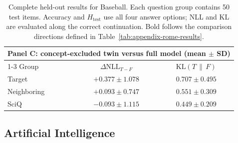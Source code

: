 \begin{table}[h]
  \vspace{1em}
  \begin{tabular}{lcc}
    \toprule
    \multicolumn{3}{l}{\textbf{Panel C: concept-excluded twin versus full model (mean $\pm$ SD)}} \\
    \cmidrule(lr){1-3}
    Group & $\Delta\mathrm{NLL}_{T-F}$ & $\mathrm{KL}(T\,\|\,F)$ \\
    \midrule
    Target      & $+0.377 \pm 1.078$ & $0.707 \pm 0.495$ \\
    Neighboring & $+0.093 \pm 0.747$ & $0.551 \pm 0.309$ \\
    SciQ        & $-0.093 \pm 1.115$ & $0.449 \pm 0.209$ \\
    \bottomrule
  \end{tabular}
  \caption{Complete held-out results for Baseball. Each question group
  contains 50 test items. Accuracy and $H_{\mathrm{test}}$ use all four answer
  options; NLL and KL are evaluated along the correct continuation. Bold
  follows the comparison directions defined in
  Table~\ref{tab:appendix-rome-results}.}
  \label{tab:appendix-baseball-results}
\end{table}

\clearpage
\subsection{Artificial Intelligence}

